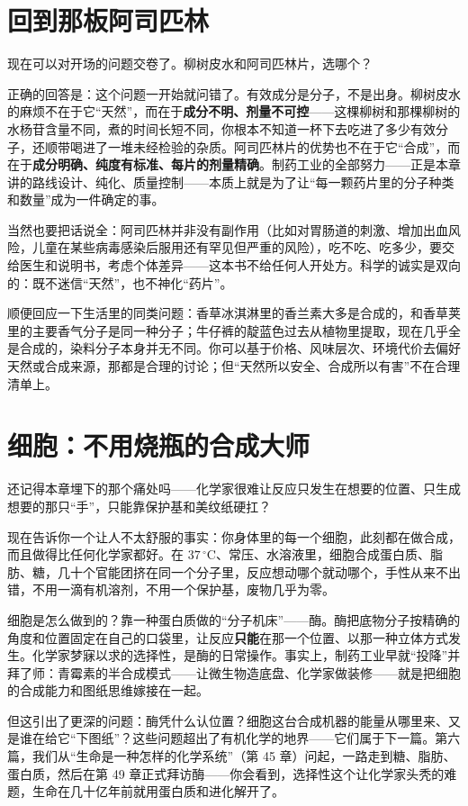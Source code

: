 \section{回到那板阿司匹林}

现在可以对开场的问题交卷了。柳树皮水和阿司匹林片，选哪个？

正确的回答是：这个问题一开始就问错了。有效成分是分子，不是出身。柳树皮水的麻烦不在于它“天然”，而在于\textbf{成分不明、剂量不可控}——这棵柳树和那棵柳树的水杨苷含量不同，煮的时间长短不同，你根本不知道一杯下去吃进了多少有效分子，还顺带喝进了一堆未经检验的杂质。阿司匹林片的优势也不在于它“合成”，而在于\textbf{成分明确、纯度有标准、每片的剂量精确}。制药工业的全部努力——正是本章讲的路线设计、纯化、质量控制——本质上就是为了让“每一颗药片里的分子种类和数量”成为一件确定的事。

当然也要把话说全：阿司匹林并非没有副作用（比如对胃肠道的刺激、增加出血风险，儿童在某些病毒感染后服用还有罕见但严重的风险），吃不吃、吃多少，要交给医生和说明书，考虑个体差异——这本书不给任何人开处方。科学的诚实是双向的：既不迷信“天然”，也不神化“药片”。

顺便回应一下生活里的同类问题：香草冰淇淋里的香兰素大多是合成的，和香草荚里的主要香气分子是同一种分子；牛仔裤的靛蓝色过去从植物里提取，现在几乎全是合成的，染料分子本身并无不同。你可以基于价格、风味层次、环境代价去偏好天然或合成来源，那都是合理的讨论；但“天然所以安全、合成所以有害”不在合理清单上。

\section{细胞：不用烧瓶的合成大师}

还记得本章埋下的那个痛处吗——化学家很难让反应只发生在想要的位置、只生成想要的那只“手”，只能靠保护基和美纹纸硬扛？

现在告诉你一个让人不太舒服的事实：你身体里的每一个细胞，此刻都在做合成，而且做得比任何化学家都好。在 $37\,^{\circ}\mathrm{C}$、常压、水溶液里，细胞合成蛋白质、脂肪、糖，几十个官能团挤在同一个分子里，反应想动哪个就动哪个，手性从来不出错，不用一滴有机溶剂，不用一个保护基，废物几乎为零。

细胞是怎么做到的？靠一种蛋白质做的“分子机床”——酶。酶把底物分子按精确的角度和位置固定在自己的口袋里，让反应\textbf{只能}在那一个位置、以那一种立体方式发生。化学家梦寐以求的选择性，是酶的日常操作。事实上，制药工业早就“投降”并拜了师：青霉素的半合成模式——让微生物造底盘、化学家做装修——就是把细胞的合成能力和图纸思维嫁接在一起。

但这引出了更深的问题：酶凭什么认位置？细胞这台合成机器的能量从哪里来、又是谁在给它“下图纸”？这些问题超出了有机化学的地界——它们属于下一篇。第六篇，我们从“生命是一种怎样的化学系统”（第 45 章）问起，一路走到糖、脂肪、蛋白质，然后在第 49 章正式拜访酶——你会看到，选择性这个让化学家头秃的难题，生命在几十亿年前就用蛋白质和进化解开了。

